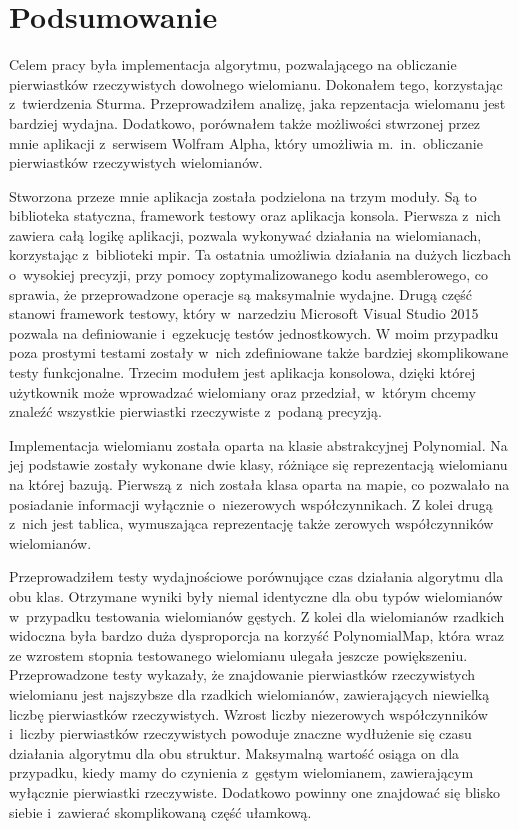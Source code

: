 \chapter{Podsumowanie}

Celem pracy była implementacja algorytmu, pozwalającego na obliczanie pierwiastków rzeczywistych dowolnego wielomianu. Dokonałem tego, korzystając z~twierdzenia Sturma. Przeprowadziłem analizę, jaka repzentacja wielomanu jest bardziej wydajna. Dodatkowo, porównałem także możliwości stwrzonej przez mnie aplikacji z~serwisem Wolfram Alpha, który umożliwia m.\ in.\ obliczanie pierwiastków rzeczywistych wielomianów.

Stworzona przeze mnie aplikacja została podzielona na trzym moduły. Są to biblioteka statyczna, framework testowy oraz aplikacja konsola. Pierwsza z~nich zawiera całą logikę aplikacji, pozwala wykonywać działania na wielomianach, korzystając z~biblioteki mpir. Ta ostatnia umożliwia działania na dużych liczbach o~wysokiej precyzji, przy pomocy zoptymalizowanego kodu asemblerowego, co sprawia, że przeprowadzone operacje są maksymalnie wydajne. Drugą część stanowi framework testowy, który w~narzedziu Microsoft Visual Studio 2015 pozwala na definiowanie i~egzekucję testów jednostkowych. W moim przypadku poza prostymi testami zostały w~nich zdefiniowane także bardziej skomplikowane testy funkcjonalne. Trzecim modułem jest aplikacja konsolowa, dzięki której użytkownik może wprowadzać wielomiany oraz przedział, w~którym chcemy znaleźć wszystkie pierwiastki rzeczywiste z~podaną precyzją.

Implementacja wielomianu została oparta na klasie abstrakcyjnej Polynomial. Na jej podstawie zostały wykonane dwie klasy, różniące się reprezentacją wielomianu na której bazują. Pierwszą z~nich została klasa oparta na mapie, co pozwalało na posiadanie informacji wyłącznie o~niezerowych współczynnikach. Z kolei drugą z~nich jest tablica, wymuszająca reprezentację także zerowych współczynników wielomianów.

Przeprowadziłem testy wydajnościowe porównujące czas działania algorytmu dla obu klas. Otrzymane wyniki były niemal identyczne dla obu typów wielomianów w~przypadku testowania wielomianów gęstych. Z kolei dla wielomianów rzadkich widoczna była bardzo duża dysproporcja na korzyść PolynomialMap, która wraz ze wzrostem stopnia testowanego wielomianu ulegała jeszcze powiększeniu. Przeprowadzone testy wykazały, że znajdowanie pierwiastków rzeczywistych wielomianu jest najszybsze dla rzadkich wielomianów, zawierających niewielką liczbę pierwiastków rzeczywistych. Wzrost liczby niezerowych współczynników i~liczby pierwiastków rzeczywistych powoduje znaczne wydłużenie się czasu działania algorytmu dla obu struktur. Maksymalną wartość osiąga on dla przypadku, kiedy mamy do czynienia z~gęstym wielomianem, zawierającym wyłącznie pierwiastki rzeczywiste. Dodatkowo powinny one znajdować się blisko siebie i~zawierać skomplikowaną część ułamkową.

